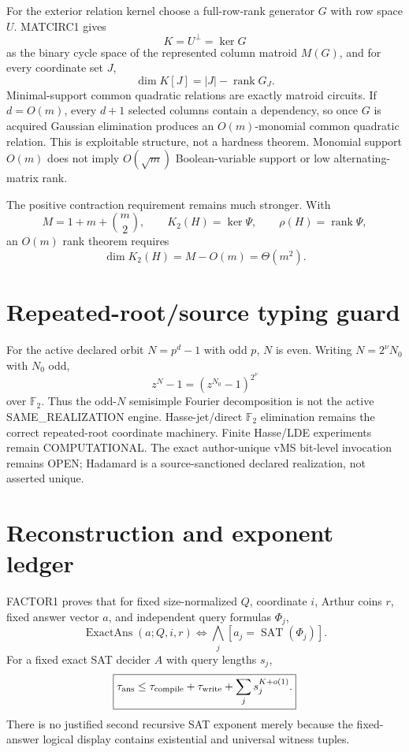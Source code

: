 \documentclass[11pt]{article}
\begin{document}
For the exterior relation kernel choose a full-row-rank generator \(G\) with row space \(U\). MATCIRC1 gives
\[
\boxed{K=U^\perp=\ker G}
\]
as the binary cycle space of the represented column matroid \(M(G)\), and for every coordinate set \(J\),
\[
\boxed{\dim K[J]=|J|-\operatorname{rank}G_J.}
\]
Minimal-support common quadratic relations are exactly matroid circuits. If \(d=O(m)\), every \(d+1\) selected columns contain a dependency, so once \(G\) is acquired Gaussian elimination produces an \(O(m)\)-monomial common quadratic relation. This is exploitable structure, not a hardness theorem. Monomial support \(O(m)\) does not imply \(O(\sqrt m)\) Boolean-variable support or low alternating-matrix rank.

The positive contraction requirement remains much stronger. With
\[
M=1+m+\binom m2,\qquad K_2(H)=\ker\Psi,\qquad \rho(H)=\operatorname{rank}\Psi,
\]
an \(O(m)\) rank theorem requires
\[
\boxed{\dim K_2(H)=M-O(m)=\Theta(m^2).}
\]

\section*{Repeated-root/source typing guard}
For the active declared orbit \(N=p^d-1\) with odd \(p\), \(N\) is even. Writing \(N=2^\nu N_0\) with \(N_0\) odd,
\[
\boxed{z^N-1=(z^{N_0}-1)^{2^\nu}}
\]
over \(\mathbb F_2\). Thus the odd-\(N\) semisimple Fourier decomposition is not the active SAME\_REALIZATION engine. Hasse-jet/direct \(\mathbb F_2\) elimination remains the correct repeated-root coordinate machinery. Finite Hasse/LDE experiments remain COMPUTATIONAL. The exact author-unique vMS bit-level invocation remains OPEN; Hadamard is a source-sanctioned declared realization, not asserted unique.

\section*{Reconstruction and exponent ledger}
FACTOR1 proves that for fixed size-normalized \(Q\), coordinate \(i\), Arthur coins \(r\), fixed answer vector \(a\), and independent query formulas \(\Phi_j\),
\[
\boxed{\operatorname{ExactAns}(a;Q,i,r)\iff
\bigwedge_j[a_j=\operatorname{SAT}(\Phi_j)].}
\]
For a fixed exact SAT decider \(A\) with query lengths \(s_j\),
\[
\boxed{\tau_{\rm ans}\le\tau_{\rm compile}+\tau_{\rm write}
+\sum_j s_j^{K+o(1)}.}
\]
There is no justified second recursive SAT exponent merely because the fixed-answer logical display contains existential and universal witness tuples.
\end{document}
